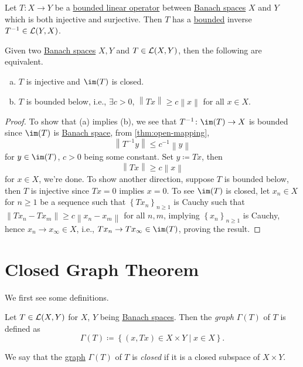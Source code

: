 \begin{corollary}\label{col:inverse-mapping}
	Let \(T\colon X\to Y\) be a \hyperref[def:bounded-linear-op]{bounded linear operator} between \hyperref[def:Banach-space]{Banach spaces} \(X\) and \(Y\) which is both injective and surjective. Then \(T\) has a \hyperref[rmk:bounded-op]{bounded} inverse \(T^{-1} \in \mathcal{\MakeUppercase{l}} (Y, X)\).
\end{corollary}

\begin{proposition}
	Given two \hyperref[def:Banach-space]{Banach spaces} \(X, Y\) and \(T\in \mathcal{\MakeUppercase{l}} (X, Y)\), then the following are equivalent.
	\begin{enumerate}[(a)]
		\item \(T\) is injective and \(\im (T)\) is closed.
		\item \(T\) is bounded below, i.e., \(\exists c > 0\), \(\left\lVert Tx\right\rVert \geq c \left\lVert x\right\rVert \) for all \(x\in X\).
	\end{enumerate}
\end{proposition}
\begin{proof}
	To show that (a) implies (b), we see that \(T^{-1} \colon \im(T) \to X\) is bounded  since \(\im(T)\) is \hyperref[def:Banach-space]{Banach space}, from \autoref{thm:open-mapping},
	\[
		\left\lVert T^{-1} y\right\rVert \leq c^{-1} \left\lVert y\right\rVert
	\]
	for \(y\in \im(T)\), \(c > 0\) being some constant. Set \(y\coloneqq Tx\), then
	\[
		\left\lVert Tx\right\rVert \geq c\left\lVert x\right\rVert
	\]
	for \(x\in X\), we're done. To show another direction, suppose \(T\) is bounded below, then \(T\) is injective since \(Tx= 0\) implies \(x = 0\). To see \(\im(T)\) is closed, let \(x_{n} \in X\) for \(n\geq 1\) be a sequence such that \(\left\{ Tx_n \right\} _{n \geq 1}\) is Cauchy such that \(\left\lVert Tx_n - Tx_m\right\rVert \geq c \left\lVert x_n - x_m\right\rVert \) for all \(n, m\), implying \(\left\{ x_n \right\} _{n\geq 1}\)  is Cauchy, hence \(x_n \to x_\infty \in X\), i.e., \(Tx_n \to Tx_\infty \in \im(T)\), proving the result.
\end{proof}

\section{Closed Graph Theorem}
We first see some definitions.
\begin{definition}[Graph]\label{def:graph}
	Let \(T\in \mathcal{\MakeUppercase{l}} (X, Y)\) for \(X\), \(Y\) being \hyperref[def:Banach-space]{Banach spaces}. Then the \emph{graph} \(\Gamma (T)\) of \(T\) is defined as
	\[
		\Gamma (T) \coloneqq \left\{ (x, Tx) \in X \times Y\mid x\in X \right\}.
	\]
\end{definition}
\begin{definition}\label{def:closed-graph}
	We say that the \hyperref[def:graph]{graph} \(\Gamma (T)\) of \(T\) is \emph{closed} if it is a closed subspace of \(X \times Y\).
\end{definition}

